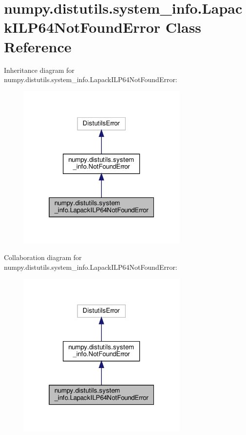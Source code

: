 \hypertarget{classnumpy_1_1distutils_1_1system__info_1_1LapackILP64NotFoundError}{}\section{numpy.\+distutils.\+system\+\_\+info.\+Lapack\+I\+L\+P64\+Not\+Found\+Error Class Reference}
\label{classnumpy_1_1distutils_1_1system__info_1_1LapackILP64NotFoundError}


Inheritance diagram for numpy.\+distutils.\+system\+\_\+info.\+Lapack\+I\+L\+P64\+Not\+Found\+Error\+:
\nopagebreak
\begin{figure}[H]
\begin{center}
\leavevmode
\includegraphics[width=241pt]{classnumpy_1_1distutils_1_1system__info_1_1LapackILP64NotFoundError__inherit__graph}
\end{center}
\end{figure}


Collaboration diagram for numpy.\+distutils.\+system\+\_\+info.\+Lapack\+I\+L\+P64\+Not\+Found\+Error\+:
\nopagebreak
\begin{figure}[H]
\begin{center}
\leavevmode
\includegraphics[width=241pt]{classnumpy_1_1distutils_1_1system__info_1_1LapackILP64NotFoundError__coll__graph}
\end{center}
\end{figure}


